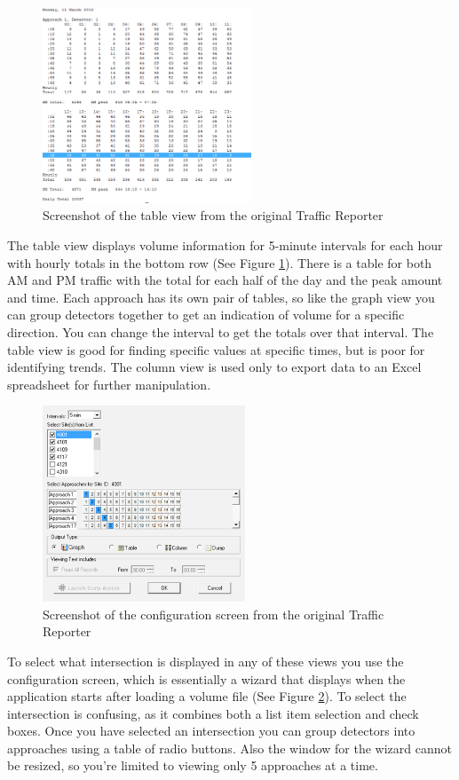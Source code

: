 \documentclass{article}
\begin{document}
\begin{figure}[!b]
\centerline{\includegraphics[height=2.3in]{oldTable}}
\caption{Screenshot of the table view from the original Traffic Reporter}
\label{fig:oldTable}
\end{figure}

The table view displays volume information for 5-minute
intervals for each hour with hourly totals in the bottom row
(See Figure \ref{fig:oldTable}). There is a table for both AM and PM traffic with
the total for each half of the day and the peak amount and
time. Each approach has its own pair of tables, so like the
graph view you can group detectors together to get an
indication of volume for a specific direction. You can change
the interval to get the totals over that interval.
The table view is good for finding specific values at
specific times, but is poor for identifying trends.
The column view is used only to export data to an Excel
spreadsheet for further manipulation.

\begin{figure}[!t]
\centerline{\includegraphics[height=2.3in]{oldConfig}}
\caption{Screenshot of the configuration screen from the original Traffic Reporter}
\label{fig:oldConfig}
\end{figure}

To select what intersection is displayed in any of these views you use the configuration screen, which is essentially a wizard that displays when the application starts after loading a volume file (See Figure \ref{fig:oldConfig}). To select the intersection is confusing, as it combines both a list item selection and check boxes. Once you have selected an intersection you can group detectors into approaches using a table of radio buttons. Also the window for the wizard cannot be resized, so you're limited to viewing only 5 approaches at a time.
\end{document}
